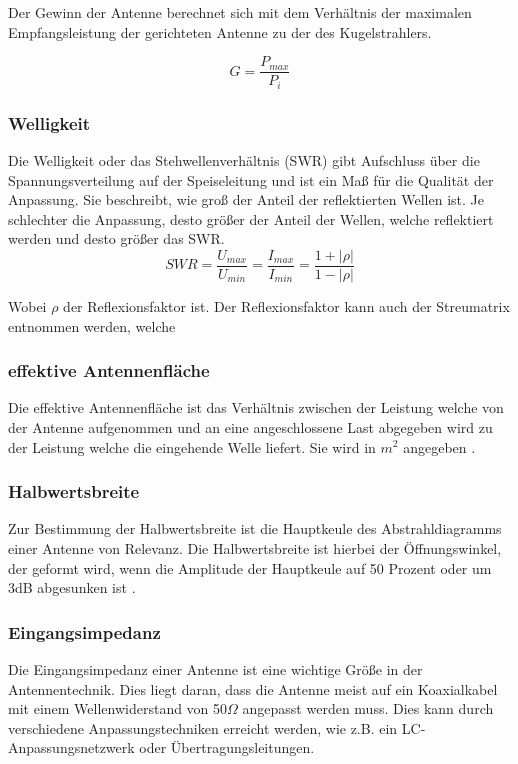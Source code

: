 Der Gewinn der Antenne berechnet sich mit dem Verhältnis der maximalen Empfangsleistung der gerichteten Antenne zu der des Kugelstrahlers\cite[26]{Kraus-2002-AntennasB}.

\begin{equation}
	G=\frac{P_{max}}{P_{i}}
\end{equation}

\subsubsection{Welligkeit}
Die Welligkeit oder das Stehwellenverhältnis (SWR) gibt Aufschluss über die Spannungsverteilung auf der Speiseleitung und ist ein Maß für die Qualität der Anpassung. Sie beschreibt, wie groß der Anteil der reflektierten Wellen ist. Je schlechter die Anpassung, desto größer der Anteil der Wellen, welche reflektiert werden und desto größer das SWR.\\

\begin{equation}
	SWR=\frac{U_{max}}{U_{min}}=\frac{I_{max}}{I_{min}}=\frac{1+\lvert \rho \lvert}{1-\lvert \rho \lvert}
\end{equation}

Wobei $\rho$ der Reflexionsfaktor ist. Der Reflexionsfaktor kann auch der Streumatrix entnommen werden, welche


\subsubsection{effektive Antennenfläche}
Die effektive Antennenfläche ist das Verhältnis zwischen der Leistung welche von der Antenne aufgenommen und an eine angeschlossene Last abgegeben wird zu der Leistung welche die eingehende Welle liefert. Sie wird in $m^2$ angegeben \cite[p. 29]{Kraus-2002-AntennasB,effective_aperture}.

\subsubsection{Halbwertsbreite}
Zur Bestimmung der Halbwertsbreite ist die Hauptkeule des Abstrahldiagramms einer Antenne von Relevanz. Die Halbwertsbreite ist hierbei der Öffnungswinkel, der geformt wird, wenn die Amplitude der Hauptkeule auf 50 Prozent oder um 3dB abgesunken ist \cite{half-power-beam-width}.

\subsubsection{Eingangsimpedanz}
Die Eingangsimpedanz einer Antenne ist eine wichtige Größe in der Antennentechnik. Dies liegt daran, dass die Antenne meist auf ein Koaxialkabel mit einem Wellenwiderstand von 50$\Omega$ angepasst werden muss. Dies kann durch verschiedene Anpassungstechniken erreicht werden, wie z.B. ein LC-Anpassungsnetzwerk oder Übertragungsleitungen. 

